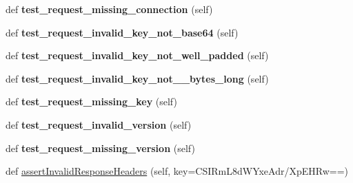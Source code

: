 \begin{DoxyCompactItemize}
\item 
\mbox{\label{classwebsockets_1_1test__handshake_1_1_handshake_tests_a9057e7d4ebc4a0b1342b93674be73713}} 
def {\bfseries test\+\_\+request\+\_\+missing\+\_\+connection} (self)
\item 
\mbox{\label{classwebsockets_1_1test__handshake_1_1_handshake_tests_ab832ce1a45dee3136bbc852ac3242029}} 
def {\bfseries test\+\_\+request\+\_\+invalid\+\_\+key\+\_\+not\+\_\+base64} (self)
\item 
\mbox{\label{classwebsockets_1_1test__handshake_1_1_handshake_tests_a2a8a0989f0299ebd8411579e0d7a02bf}} 
def {\bfseries test\+\_\+request\+\_\+invalid\+\_\+key\+\_\+not\+\_\+well\+\_\+padded} (self)
\item 
\mbox{\label{classwebsockets_1_1test__handshake_1_1_handshake_tests_a731df6a5bfa91ef921b83411d59bb852}} 
def {\bfseries test\+\_\+request\+\_\+invalid\+\_\+key\+\_\+not\+\_\+\_\+bytes\+\_\+long} (self)
\item 
\mbox{\label{classwebsockets_1_1test__handshake_1_1_handshake_tests_a69e90b4f55a9bcf3f542ea862c10a7ef}} 
def {\bfseries test\+\_\+request\+\_\+missing\+\_\+key} (self)
\item 
\mbox{\label{classwebsockets_1_1test__handshake_1_1_handshake_tests_a58b4fb51bdbc963b875d1fae6abe78f2}} 
def {\bfseries test\+\_\+request\+\_\+invalid\+\_\+version} (self)
\item 
\mbox{\label{classwebsockets_1_1test__handshake_1_1_handshake_tests_a90d8b4248da93aab9fb40b2fca9da4ff}} 
def {\bfseries test\+\_\+request\+\_\+missing\+\_\+version} (self)
\item 
def \hyperlink{classwebsockets_1_1test__handshake_1_1_handshake_tests_afad82c0cd59e503d9cd6f3ab947e6d27}{assert\+Invalid\+Response\+Headers} (self, key=\textquotesingle{}C\+S\+I\+Rm\+L8d\+W\+Yxe\+Adr/Xp\+E\+H\+Rw==\textquotesingle{})

\end{DoxyCompactItemize}

